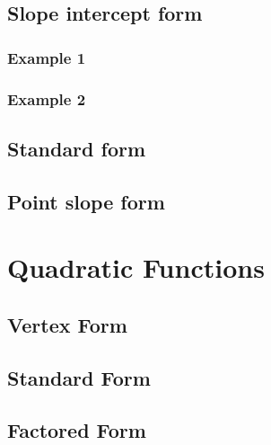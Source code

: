 \documentclass[11pt]{article}
\begin{document}
\subsection{Slope intercept form}
\subsubsection{Example 1}
\subsubsection{Example 2}
\subsection{Standard form}
\subsection{Point slope form}
\section{Quadratic Functions}
\subsection{Vertex Form}
\subsection{Standard Form}
\subsection{Factored Form}
\end{document}
